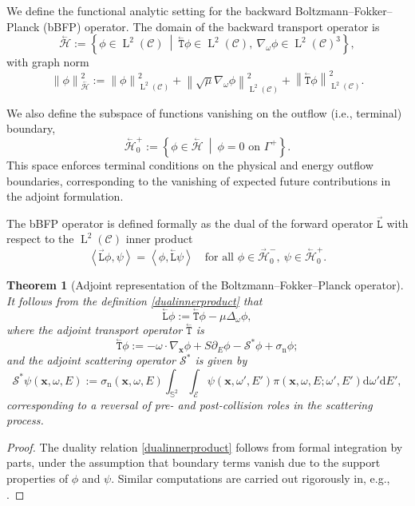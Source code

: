 \documentclass{amsart}
\newcommand{\dd}{{\mathrm d}}
\newcommand{\bT}{\stackrel{_\leftarrow}{\mathtt T}}
\newcommand{\fL}{\stackrel{_\rightarrow}{\mathtt L}}
\newcommand{\bL}{\stackrel{_\leftarrow}{\mathtt L}}
\theoremstyle{plain}
\newtheorem{theorem}{Theorem}[section]
\newcommand{\Norm}[1]{\ensuremath{\left\|#1\right\|}}
\renewcommand{\vec}[1]{\ensuremath{\boldsymbol{#1}}}
\newcommand{\leb}{\text{Leb}}
\newcommand{\LL}{\ensuremath{\operatorname L}\xspace}
\renewcommand{\leb}[1]{\ensuremath{\LL^{#1}}}
\newcommand{\ltwop}[2]{\ensuremath{\!\left\langle{#1,#2}\right\rangle}}
\newcommand{\cH}{\stackrel{_\rightarrow}{\mathscr H}}
\newcommand{\cbH}{\stackrel{_\leftarrow}{\mathscr H}}
\newcommand{\cS}{\ensuremath{\mathscr S}}
\begin{document}
We define the functional analytic setting for the backward
Boltzmann--Fokker--Planck (bBFP) operator. The domain of the backward
transport operator is
\begin{equation}
    \cbH 
    := 
    \left\{
    \phi \in \leb2(\mathcal{C})
    ~\middle|~
    \bT \phi \in \leb2(\mathcal{C}),\ 
    \nabla_{\omega} \phi \in \leb2(\mathcal{C})^3
    \right\},
\end{equation}
with graph norm
\begin{equation}
    \Norm{\phi}_{\cbH}^2
    :=
    \Norm{\phi}^2_{\leb2(\mathcal{C})} 
    + \Norm{\sqrt{\mu} \nabla_{\omega} \phi}^2_{\leb2(\mathcal{C})}
    + \Norm{\bT \phi}^2_{\leb2(\mathcal{C})}.
\end{equation}

We also define the subspace of functions vanishing on the outflow
(i.e., terminal) boundary,
\begin{equation}
    \cbH_0^+ :=
    \left\{
    \phi \in \cbH ~\middle|~
    \phi = 0 \text{ on } \Gamma^+
    \right\}.
\end{equation}
This space enforces terminal conditions on the physical and energy
outflow boundaries, corresponding to the vanishing of expected future
contributions in the adjoint formulation.

The bBFP operator is defined formally as the dual of the forward
operator $\fL$ with respect to the $\leb2(\mathcal{C})$ inner product
\begin{equation}
  \ltwop{\fL \phi}{\psi} = \ltwop{\phi}{\bL \psi}
  \quad
  \text{for all } \phi \in \cH_0^-,~ \psi \in \cbH_0^+.
  \label{dualinnerproduct}
\end{equation}

\begin{theorem}[Adjoint representation of the Boltzmann–Fokker–Planck operator]
  It follows from the definition \eqref{dualinnerproduct}
  that
  \begin{equation}\label{backwards_BFP} \bL \phi := \bT \phi -
    \mu \Delta_{\omega} \phi,
  \end{equation}
  where the adjoint transport operator $\bT$ is
  \begin{equation}
    \bT \phi := - \omega \cdot \nabla_{\vec x} \phi 
    + S \partial_E \phi 
    - \cS^* \phi + \sigma_{\mathrm{n}} \phi;
  \end{equation}
  and the adjoint scattering operator $\cS^*$ is given by
  \begin{equation}
    \cS^* \psi(\vec x,\omega,E) := \sigma_{\mathrm{n}} (\vec x,\omega,E)\int_{\mathbb{S}^2} \int_{\mathcal{E}}
    \psi(\vec x, \omega', E') \pi(\vec x,\omega, E;  \omega',   E')\dd \omega'  \dd E',
  \end{equation}
  corresponding to a reversal of pre- and post-collision
  roles in the scattering process.
\end{theorem}
\begin{proof}
  The duality relation \eqref{dualinnerproduct} follows from formal
  integration by parts, under the assumption that boundary terms
  vanish due to the support properties of $\phi$ and $\psi$. Similar
  computations are carried out rigorously in, e.g., \cite{DL6}.
\end{proof}
\end{document}
